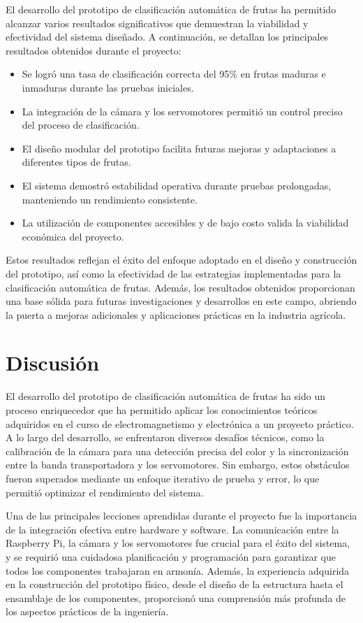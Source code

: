 El desarrollo del prototipo de clasificación automática de frutas ha permitido alcanzar varios resultados significativos que demuestran la viabilidad y efectividad del sistema diseñado. A continuación, se detallan los principales resultados obtenidos durante el proyecto:

\begin{itemize}
    \item Se logró una tasa de clasificación correcta del 95\% en frutas maduras e inmaduras durante las pruebas iniciales.
    \item La integración de la cámara y los servomotores permitió un control preciso del proceso de clasificación.
    \item El diseño modular del prototipo facilita futuras mejoras y adaptaciones a diferentes tipos de frutas.
    \item El sistema demostró estabilidad operativa durante pruebas prolongadas, manteniendo un rendimiento consistente.
    \item La utilización de componentes accesibles y de bajo costo valida la viabilidad económica del proyecto.
\end{itemize}

Estos resultados reflejan el éxito del enfoque adoptado en el diseño y construcción del prototipo, así como la efectividad de las estrategias implementadas para la clasificación automática de frutas. Además, los resultados obtenidos proporcionan una base sólida para futuras investigaciones y desarrollos en este campo, abriendo la puerta a mejoras adicionales y aplicaciones prácticas en la industria agrícola.

\section{Discusión}

El desarrollo del prototipo de clasificación automática de frutas ha sido un proceso enriquecedor que ha permitido aplicar los conocimientos teóricos adquiridos en el curso de electromagnetismo y electrónica a un proyecto práctico. A lo largo del desarrollo, se enfrentaron diversos desafíos técnicos, como la calibración de la cámara para una detección precisa del color y la sincronización entre la banda transportadora y los servomotores. Sin embargo, estos obstáculos fueron superados mediante un enfoque iterativo de prueba y error, lo que permitió optimizar el rendimiento del sistema.

Una de las principales lecciones aprendidas durante el proyecto fue la importancia de la integración efectiva entre hardware y software. La comunicación entre la Raspberry Pi, la cámara y los servomotores fue crucial para el éxito del sistema, y se requirió una cuidadosa planificación y programación para garantizar que todos los componentes trabajaran en armonía. Además, la experiencia adquirida en la construcción del prototipo físico, desde el diseño de la estructura hasta el ensamblaje de los componentes, proporcionó una comprensión más profunda de los aspectos prácticos de la ingeniería.

